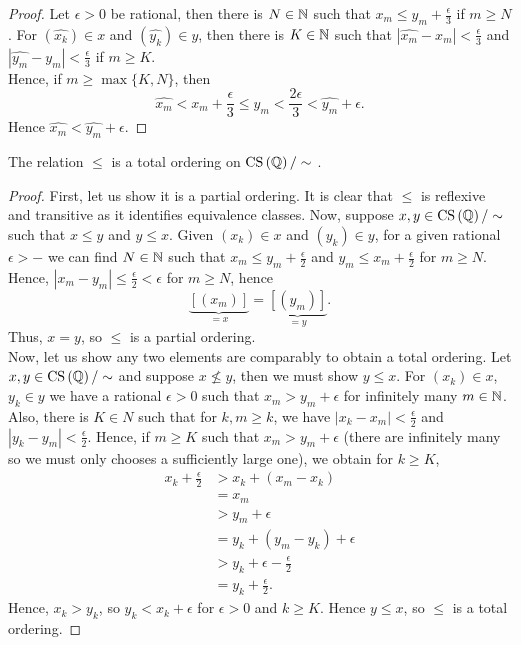 \begin{proof}
	Let \(\epsilon > 0\) be rational, then there is \(N \in \mathbb{N}\) such that \(x_{m} \le y_{m} + \frac{\epsilon}{3}\) if \(m\ge N\). For \(\left( \hat{x_{k}} \right) \in x\) and \(\left( \hat{y_{k}} \right) \in y\), then there is \(K \in \mathbb{N}\) such that \(\left| \hat{x_{m}}- x_{m} \right| < \frac{\epsilon}{3}\) and \(\left| \hat{y_{m}}- y_{m} \right| < \frac{\epsilon}{3}\) if \(m \ge K\).\\
	Hence, if \(m\ge \max \{K, N\} \), then \[
		\hat{x_{m}}< x_{m} + \frac{\epsilon}{3}\le y_{m} < \frac{2\epsilon}{3}< \hat{y_{m}}+ \epsilon
	.\]
Hence \(\hat{x_{m}} < \hat{y_{m}} + \epsilon\).
\end{proof}
\begin{lemma}
	The relation \(\leqslant\) is a total ordering on \(\operatorname{CS} \left( \mathbb{Q} \right)  / \sim\) .
\end{lemma}
\begin{proof}
	First, let us show it is a partial ordering. It is clear that \(\leqslant\) is reflexive and transitive as it identifies equivalence classes. Now, suppose \(x, y \in \operatorname{CS} \left( \mathbb{Q} \right) / \sim\) such that \(x\leqslant y\) and \(y \leqslant x\). Given \(\left( x_{k} \right) \in x\) and \(\left( y_{k} \right) \in y\), for a given rational \(\epsilon > -\) we can find \(N \in \mathbb{N}\) such that \(x_{m} \le y_{m} + \frac{\epsilon}{2}\) and \(y_{m} \le x_{m} + \frac{\epsilon}{2}\) for \(m \ge N\).\\
	Hence, \(\left| x_{m} - y_{m} \right|\le \frac{\epsilon}{2}< \epsilon \) for \(m \ge N\), hence \[\underbrace{\left[ \left( x_{m} \right)  \right] }_{= x} = \underbrace{\left[ \left( y_{m} \right)  \right] }_{=y}.\] Thus, \(x=y\), so \(\leqslant\) is a partial ordering.\\
	\newpage
	Now, let us show any two elements are comparably to obtain a total ordering. Let \(x, y \in \operatorname{CS}\left( \mathbb{Q} \right) / \sim\) and suppose \(x\nleqslant y\), then we must show \(y\leqslant x\). For \(\left( x_{k} \right) \in x\), \(y_{k} \in y\) we have a rational \(\epsilon > 0\) such that \(x_{m} > y_{m} + \epsilon\) for infinitely many \(m \in \mathbb{N}\). Also, there is \(K \in N\) such that for \(k, m \ge k\), we have \(\left| x_{k} - x_{m}  \right| < \frac{\epsilon}{2}\) and \(\left| y_{k} - y_{m} \right| < \frac{\epsilon}{2}\). Hence, if \(m\ge K\) such that \(x_{m} > y_{m} + \epsilon\) (there are infinitely many so we must only chooses a sufficiently large one), we obtain for \(k \ge K\),
	\begin{align*}
	x_{k} + \frac{\epsilon}{2} &> x_{k} + \left( x_{m} - x_{k} \right)  \\
				   &= x_{m} \\
				   &> y_{m} + \epsilon \\
				   &= y_{k} + \left( y_{m} - y_{k} \right) + \epsilon \\
				   &> y_{k} + \epsilon - \frac{\epsilon}{2}\\
				   &= y_{k} + \frac{\epsilon}{2}
	.\end{align*}
	Hence, \(x_{k} > y_{k}\), so \(y_{k} < x_{k} + \epsilon\) for \(\epsilon > 0\) and \(k \ge K\). Hence \(y \leqslant x\), so \(\leqslant\) is a total ordering.
\end{proof}
